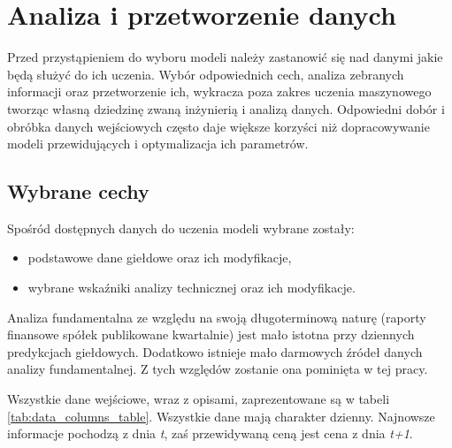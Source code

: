 \documentclass[a4paper, twoside, 11pt, openright]{article}
\begin{document}
\newpage

\section{Analiza i przetworzenie danych}

Przed przystąpieniem do wyboru modeli należy zastanowić się nad danymi jakie będą służyć do ich uczenia. Wybór odpowiednich cech, analiza zebranych informacji oraz przetworzenie ich, wykracza poza zakres uczenia maszynowego tworząc własną dziedzinę zwaną inżynierią i analizą danych. Odpowiedni dobór i obróbka danych wejściowych często daje większe korzyści niż dopracowywanie modeli przewidujących i optymalizacja ich parametrów. 

\subsection{Wybrane cechy}

Spośród dostępnych danych do uczenia modeli wybrane zostały: 
\begin{itemize}
\item podstawowe dane giełdowe oraz ich modyfikacje,
\item wybrane wskaźniki analizy technicznej oraz ich modyfikacje.
\end{itemize}

Analiza fundamentalna ze względu na swoją długoterminową naturę (raporty finansowe spółek publikowane kwartalnie) jest mało istotna przy dziennych predykcjach giełdowych. Dodatkowo istnieje mało darmowych źródeł danych analizy fundamentalnej. Z tych względów zostanie ona pominięta w tej pracy.

\bigskip

Wszystkie dane wejściowe, wraz z opisami, zaprezentowane są w tabeli \ref{tab:data_columns_table}. Wszystkie dane mają charakter dzienny. Najnowsze informacje pochodzą z dnia \textit{t}, zaś przewidywaną ceną jest cena z dnia \textit{t+1}.
\end{document}
